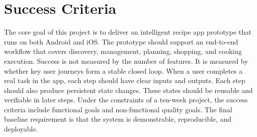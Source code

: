 \documentclass[journal]{IEEEtran}
\begin{document}
\section{Success Criteria}

The core goal of this project is to deliver an intelligent recipe app prototype that runs on both Android and iOS. The prototype should support an end-to-end workflow that covers discovery, management, planning, shopping, and cooking execution. Success is not measured by the number of features. It is measured by whether key user journeys form a stable closed loop. When a user completes a real task in the app, each step should have clear inputs and outputs. Each step should also produce persistent state changes. These states should be reusable and verifiable in later steps. Under the constraints of a ten-week project, the success criteria include functional goals and non-functional quality goals. The final baseline requirement is that the system is demonstrable, reproducible, and deployable.
\end{document}
